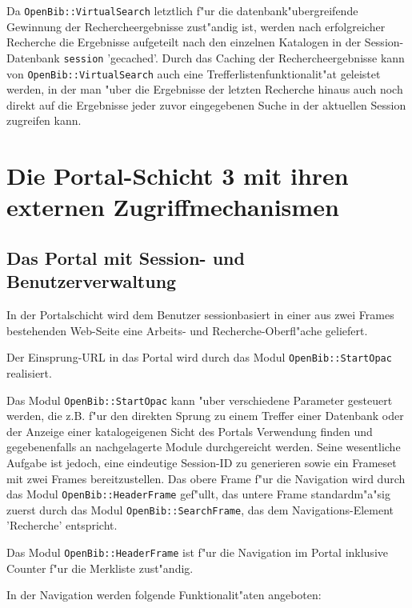\documentclass[11pt, twoside, a4paper, BCOR8mm, DIV12, bibtotoc,idxtotoc]{scrbook}
\begin{document}
Da \texttt{OpenBib::VirtualSearch} letztlich f"ur die
datenbank"ubergreifende Gewinnung der Recherche\-er\-geb\-nisse zust"andig
ist, werden nach erfolgreicher Recherche die Ergebnisse aufgeteilt
nach den einzelnen Katalogen in der Session-Datenbank \texttt{session}
'gecached'. Durch das Caching der Re\-cher\-che\-ergebnisse kann von
\texttt{OpenBib::VirtualSearch} auch eine Trefferlistenfunktionalit"at
geleistet werden, in der man "uber die Ergebnisse der letzten
Recherche hinaus auch noch direkt auf die Ergebnisse jeder zuvor eingegebenen
Suche in der aktuellen Session zugreifen kann.

\section{Die Portal-Schicht 3 mit ihren externen Zugriffmechanismen}

\subsection{Das Portal mit Session- und Benutzerverwaltung}

In der Portalschicht wird dem Benutzer sessionbasiert in einer aus
zwei Frames bestehenden Web-Seite eine Arbeits- und Recherche-Oberfl"ache
geliefert. 

Der Einsprung-URL in das Portal wird durch das Modul
\texttt{OpenBib::StartOpac} realisiert.

Das Modul \texttt{OpenBib::StartOpac} kann "uber verschiedene Parameter
gesteuert werden, die z.B. f"ur den direkten Sprung zu einem Treffer
einer Datenbank oder der Anzeige einer katalogeigenen Sicht des
Portals Verwendung finden und gegebenenfalls an nachgelagerte Module
durchgereicht werden. Seine wesentliche Aufgabe ist jedoch, eine
eindeutige Session-ID zu generieren sowie ein Frameset mit zwei Frames
bereitzustellen.  Das obere Frame f"ur die Navigation wird durch das Modul
\texttt{OpenBib::HeaderFrame} gef"ullt, das untere Frame standardm"a"sig
zuerst durch das Modul \texttt{OpenBib::SearchFrame}, das dem
Navigations-Element 'Recherche' entspricht.

Das Modul \texttt{OpenBib::HeaderFrame} ist f"ur die Navigation im Portal
inklusive Counter f"ur die Merkliste zust"andig.

In der Navigation werden folgende Funktionalit"aten angeboten:
\end{document}
